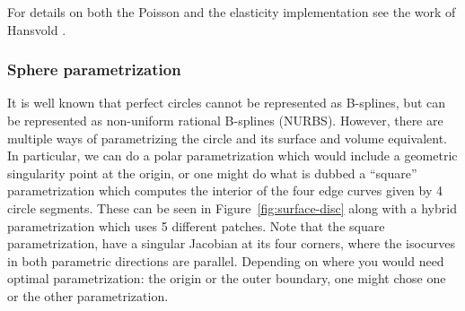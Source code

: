 \documentclass[preprint,12pt, a4paper]{elsarticle}
\begin{document}
For details on both the Poisson and the elasticity implementation see the work of Hansvold \cite{hansvold2015mgt}. 


\subsubsection{Sphere parametrization}
\label{sec:sphere}
It is well known that perfect circles cannot be represented as B-splines, but can be represented as non-uniform rational B-splines (NURBS).
However, there are multiple ways of parametrizing the circle and its surface and volume equivalent.
In particular, we can do a polar parametrization which would include a geometric singularity point at the origin, or one might do what is dubbed a ``square'' parametrization which computes the interior of the four edge curves given by 4 circle segments.
These can be seen in Figure~\ref{fig:surface-disc} along with a hybrid parametrization which uses 5 different patches.
Note that the square parametrization, have a singular Jacobian at its four corners, where the isocurves in both parametric directions are parallel.
Depending on where you would need optimal parametrization: the origin or the outer boundary, one might chose one or the other parametrization.
\end{document}
